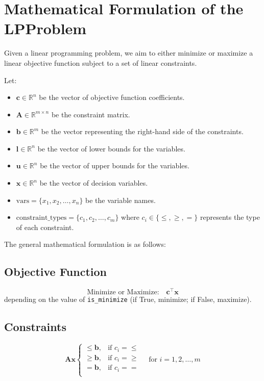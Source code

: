 \documentclass{article}
\begin{document}
\section*{Mathematical Formulation of the LPProblem}

Given a linear programming problem, we aim to either minimize or maximize a linear objective function subject to a set of linear constraints.

Let:
\begin{itemize}
    \item $\mathbf{c} \in \mathbb{R}^n$ be the vector of objective function coefficients.
    \item $\mathbf{A} \in \mathbb{R}^{m \times n}$ be the constraint matrix.
    \item $\mathbf{b} \in \mathbb{R}^m$ be the vector representing the right-hand side of the constraints.
    \item $\mathbf{l} \in \mathbb{R}^n$ be the vector of lower bounds for the variables.
    \item $\mathbf{u} \in \mathbb{R}^n$ be the vector of upper bounds for the variables.
    \item $\mathbf{x} \in \mathbb{R}^n$ be the vector of decision variables.
    \item $\text{vars} = \{x_1, x_2, \dots, x_n\}$ be the variable names.
    \item $\text{constraint\_types} = \{c_1, c_2, \dots, c_m\}$ where $c_i \in \{\leq, \geq, =\}$ represents the type of each constraint.
\end{itemize}

The general mathematical formulation is as follows:

\subsection*{Objective Function}
\[
\text{Minimize or Maximize:} \quad \mathbf{c}^\top \mathbf{x}
\]
depending on the value of \texttt{is\_minimize} (if True, minimize; if False, maximize).

\subsection*{Constraints}
\[
\mathbf{A} \mathbf{x} \begin{cases} 
\leq \mathbf{b}, & \text{if } c_i = \leq \\
\geq \mathbf{b}, & \text{if } c_i = \geq \\
= \mathbf{b}, & \text{if } c_i = = \\
\end{cases} \quad \text{for } i = 1, 2, \dots, m
\]
\end{document}
